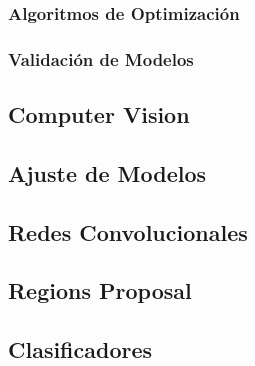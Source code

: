 \subsubsection{Algoritmos de Optimización}

\subsubsection{Validación de Modelos}


\subsection{Computer Vision}

\subsection{Ajuste de Modelos}

\subsection{Redes Convolucionales}

\subsection{Regions Proposal}

\subsection{Clasificadores}







